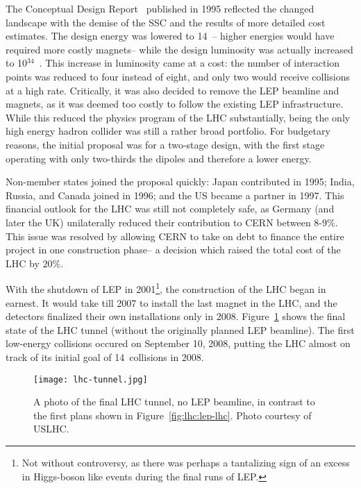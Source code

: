 The Conceptual Design Report~\cite{LHCCDR} published in 1995 reflected the changed landscape with the demise of the SSC and the results of more detailed cost estimates. The design energy was lowered to 14~\TeV-- higher energies would have required more costly magnets-- while the design luminosity was actually increased to 10$^{34}$~\lumirate. This increase in luminosity came at a cost: the number of interaction points was reduced to four instead of eight, and only two would receive collisions at a high rate.  Critically, it was also decided to remove the LEP beamline and magnets, as it was deemed too costly to follow the existing LEP infrastructure. While this reduced the physics program of the LHC substantially, being the only high energy hadron collider was still a rather broad portfolio. For budgetary reasons, the initial proposal was for a two-stage design, with the first stage operating with only two-thirds the dipoles and therefore a lower energy.

Non-member states joined the proposal quickly: Japan contributed in 1995; India, Russia, and Canada joined in 1996; and the US became a partner in 1997. This financial outlook for the LHC was still not completely safe, as Germany (and later the UK) unilaterally reduced their contribution to CERN between 8-9$\%$. This issue was resolved by allowing CERN to take on debt to finance the entire project in one construction phase-- a decision which raised the total cost of the LHC by $20\%$.


With the shutdown of LEP in 2001\footnote{Not without controversy, as there was perhaps a tantalizing sign of an excess in Higgs-boson like events during the final runs of LEP.}, the construction of the LHC began in earnest. It would take till 2007 to install the last magnet in the LHC, and the detectors finalized their own installations only in 2008. Figure~\ref{fig:lhc:lhc-tunnel} shows the final state of the LHC tunnel (without the originally planned LEP beamline). The first low-energy collisions occured on September 10, 2008, putting the LHC almost on track of its initial goal of 14~\TeV collisions in 2008. 


\begin{figure}
\centering
\texttt{[image: lhc-tunnel.jpg]}
\label{fig:lhc:lhc-tunnel}
\caption{A photo of the final LHC tunnel, no LEP beamline, in contrast to the first plans shown in Figure~\ref{fig:lhc:lep-lhc}. Photo courtesy of USLHC.}
\end{figure}

